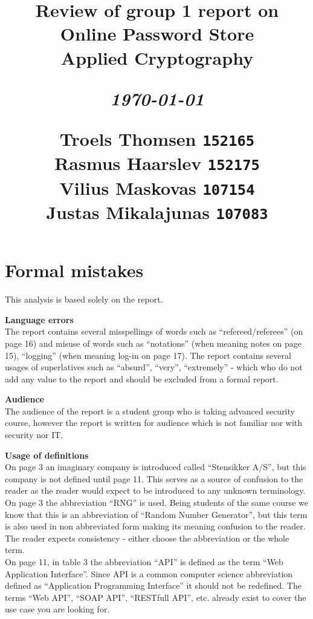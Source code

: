 \documentclass[10pt]{article}
\title{
  \vspace{4cm}
  \begin{flushleft}
  \Large{\textbf{Review of group 1 report on Online Password Store}} \\
  \large{Applied Cryptography}
  \end{flushleft}
  \vspace{0cm}
  \begin{flushleft}
  \small
  \textit{\today}
  \end{flushleft}
  \vspace{12cm}
  \begin{flushleft}
  \small
  Troels Thomsen \texttt{152165} \\
  Rasmus Haarslev \texttt{152175} \\
  Vilius Maskovas \texttt{107154} \\
  Justas Mikalajunas \texttt{107083}\\
  \end{flushleft}
}
\date{
}
\begin{document}
\clearpage
{}
\thispagestyle{empty}
\maketitle

\newpage


\section{Formal mistakes}
\label{sec:Formal mistakes}

This analysis is based solely on the report.

\textbf{Language errors} \\
The report contains several misspellings of words such as “refereed/referees” (on page 16) and misuse of words such as “notations” (when meaning notes on page 15), “logging” (when meaning log-in on page 17).
The report contains several usages of superlatives such as “absurd”, “very”, “extremely” - which who do not add any value to the report and should be excluded from a formal report.

\textbf{Audience} \\
The audience of the report is a student group who is taking advanced security course, however the report is written for audience which is not familiar nor with security nor IT.

\textbf{Usage of definitions} \\
On page 3 an imaginary company is introduced called “Stensikker A/S”, but this company is not defined until page 11. This serves as a source of confusion to the reader as the reader would expect to be introduced to any unknown terminology. \\
On page 3 the abbreviation “RNG” is used. Being students of the same course we know that this is an abbreviation of “Random Number Generator”, but this term is also used in non abbreviated form making its meaning confusion to the reader. The reader expects consistency - either choose the abbreviation or the whole term. \\
On page 11, in table 3 the abbreviation “API” is defined as the term “Web Application Interface”. Since API is a common computer science abbreviation defined as “Application Programming Interface” it should not be redefined. The terms “Web API”, “SOAP API”, “RESTfull API”, etc. already exist to cover the use case you are looking for.
\end{document}
